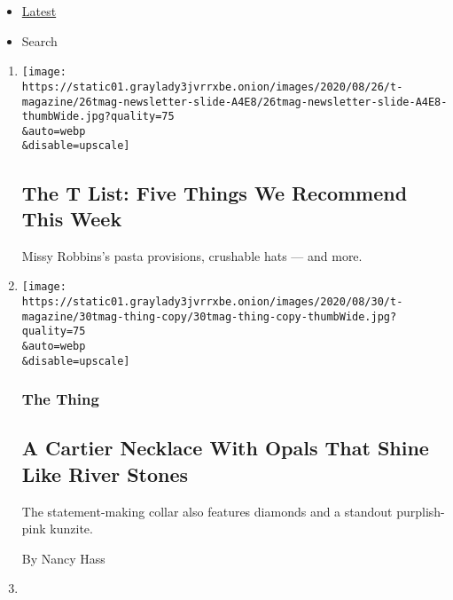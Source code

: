 \begin{itemize}
\tightlist
\item
  \protect\hyperlink{stream-panel}{Latest}
\item
  Search
\end{itemize}

\begin{enumerate}
\def\labelenumi{\arabic{enumi}.}
\item
  \href{/2020/08/27/t-magazine/misi-pasta-gregory-halpern.html}{}

  \texttt{[image: https://static01.graylady3jvrrxbe.onion/images/2020/08/26/t-magazine/26tmag-newsletter-slide-A4E8/26tmag-newsletter-slide-A4E8-thumbWide.jpg?quality=75\\\&auto=webp\\\&disable=upscale]}

  \hypertarget{the-t-list-five-things-we-recommend-this-week-1}{%
  \subsection{The T List: Five Things We Recommend This
  Week}\label{the-t-list-five-things-we-recommend-this-week-1}}

  Missy Robbins's pasta provisions, crushable hats --- and more.
\item
  \href{/2020/08/26/t-magazine/cartier-necklace-surnaturel.html}{}

  \texttt{[image: https://static01.graylady3jvrrxbe.onion/images/2020/08/30/t-magazine/30tmag-thing-copy/30tmag-thing-copy-thumbWide.jpg?quality=75\\\&auto=webp\\\&disable=upscale]}

  \hypertarget{the-thing}{%
  \subsubsection{The Thing}\label{the-thing}}

  \hypertarget{a-cartier-necklace-with-opals-that-shine-like-river-stones}{%
  \subsection{A Cartier Necklace With Opals That Shine Like River
  Stones}\label{a-cartier-necklace-with-opals-that-shine-like-river-stones}}

  The statement-making collar also features diamonds and a standout
  purplish-pink kunzite.

  By Nancy Hass
\item
  \href{/2020/08/26/t-magazine/cottage-stockholm-home-design.html}{}


\end{enumerate}
